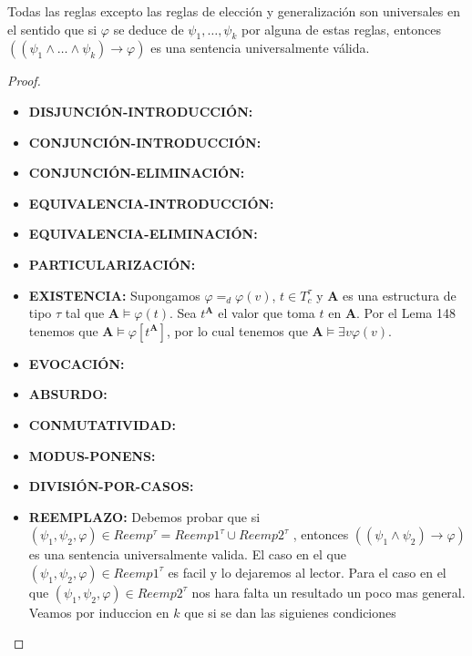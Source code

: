   \begin{lemma}
    \PN Todas las reglas excepto las reglas de elección y generalización son universales en el sentido que si $\varphi$
    se deduce de $\psi_{1}, \dotsc, \psi_{k}$ por alguna de estas reglas, entonces $\left((\psi_{1} \wedge \dotsc \wedge
    \psi_{k}) \rightarrow \varphi \right)$ es una sentencia universalmente válida.
  \end{lemma}
  \begin{proof}
    \begin{itemize}
      \item \textbf{DISJUNCIÓN-INTRODUCCIÓN:}
      \item \textbf{CONJUNCIÓN-INTRODUCCIÓN:}
      \item \textbf{CONJUNCIÓN-ELIMINACIÓN:}
      \item \textbf{EQUIVALENCIA-INTRODUCCIÓN:}
      \item \textbf{EQUIVALENCIA-ELIMINACIÓN:}
      \item \textbf{PARTICULARIZACIÓN:}

      \item \textbf{EXISTENCIA:} Supongamos $\varphi =_{d}\varphi (v)$, $t\in T_{c}^{\tau }$ y $\mathbf{A}$ es una
      estructura de tipo $\tau $ tal que $\mathbf{A}\models \varphi (t)$. Sea $t^{\mathbf{A}}$ el valor que toma $t$ en
      $\mathbf{A}$. Por el Lema 148 tenemos que $\mathbf{A}\models \varphi \left\lbrack t^{\mathbf{A}}\right\rbrack $,
      por lo cual tenemos que $\mathbf{A}\models \exists v\varphi (v)$.

      \item \textbf{EVOCACIÓN:}
      \item \textbf{ABSURDO:}
      \item \textbf{CONMUTATIVIDAD:}
      \item \textbf{MODUS-PONENS:}
      \item \textbf{DIVISIÓN-POR-CASOS:}

      \item \textbf{REEMPLAZO:} Debemos probar que si $(\psi_{1},\psi_{2},\varphi )\in Reemp^{\tau }=Reemp1^{\tau }\cup Reemp2^{\tau }$ , entonces $\left( (\psi_{1}\wedge \psi_{2})\rightarrow \varphi \right) $ es una sentencia universalmente valida. El caso en el que $(\psi_{1},\psi_{2},\varphi )\in Reemp1^{\tau }$ es facil y lo dejaremos al lector. Para el caso en el que $(\psi_{1},\psi_{2},\varphi )\in Reemp2^{\tau }$ nos hara falta un resultado un poco mas general. Veamos por induccion en $k$ que si se dan las siguienes condiciones


\end{itemize}
\end{proof}
